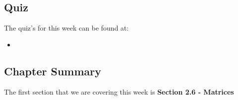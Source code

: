 \subsection{Quiz}

The quiz's for this week can be found at:

\begin{itemize}
    \item {}
\end{itemize}

\newpage

\subsection{Chapter Summary}

The first section that we are covering this week is \textbf{Section 2.6 - Matrices}

